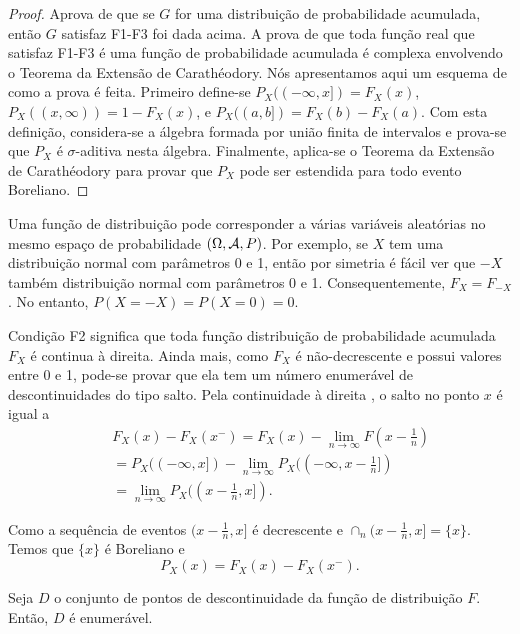 \begin{frame}
%
\begin{proof} Aprova de que se $G$ for uma distribuição de probabilidade
acumulada, então $G$ satisfaz F1-F3 foi dada acima. A prova de que
toda função real que satisfaz F1-F3 é uma função de probabilidade
acumulada é complexa envolvendo o Teorema da Extensão de
Carathéodory. Nós apresentamos aqui um esquema de como a prova é
feita. Primeiro define-se $P_X((-\infty, x])=F_X(x)$,
$P_X((x,\infty))=1-F_X(x)$, e $P_X((a,b])=F_X(b)-F_X(a)$. Com esta
definição, considera-se a álgebra formada por união finita de
intervalos e prova-se que $P_X$ é $\sigma$-aditiva nesta álgebra.
Finalmente, aplica-se o Teorema da Extensão de Carathéodory para
provar que $P_X$ pode ser estendida para todo evento Boreliano.
\end{proof}

\begin{nota}
	
	Uma função de distribuição pode corresponder a várias variáveis aleatórias no mesmo espaço de probabilidade $(\Omega,{\cal A},P)$. Por exemplo, se $X$ tem uma distribuição normal com parâmetros 0 e 1, então por simetria é fácil ver que $-X$ também distribuição normal com parâmetros 0 e 1. Consequentemente, $F_X=F_{-X}$. No entanto, $P(X=-X)=P(X=0)=0$.
\end{nota}
\end{frame}
%
\begin{frame}
%
\bigskip
Condição F2 significa que toda função distribuição de probabilidade
acumulada $F_X$ é continua à direita. Ainda mais, como $F_X$ é
não-decrescente e possui valores entre 0 e 1, pode-se provar que ela
tem um número enumerável de descontinuidades do tipo salto. Pela
continuidade à direita , o salto no ponto $x$ é igual a
\begin{eqnarray}
& & F_X(x)-F_X(x^-)=F_X(x)-\lim_{n\rightarrow
	\infty}F(x-\frac{1}{n})\nonumber\\
& & = P_X((-\infty,x]) - \lim_{n\rightarrow
	\infty}P_X((-\infty,x-\frac{1}{n}])\nonumber\\
& & =\lim_{n\rightarrow\infty}P_X((x-\frac{1}{n},x]).\nonumber
\end{eqnarray}

Como a sequência de eventos $(x-\frac{1}{n},x]$ é decrescente e
$\cap_n (x-\frac{1}{n},x]=\{x\}$. Temos que $\{x\}$ é Boreliano e
%
$$P_X(x)=F_X(x)-F_X(x^-).$$
%
\begin{teo}
Seja $D$ o conjunto de pontos de descontinuidade da função de distribuição $F$. Então, $D$ é enumerável.
\end{teo}

\end{frame}
